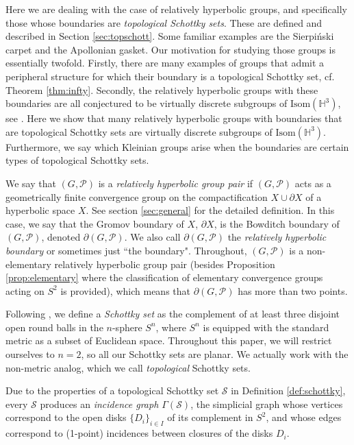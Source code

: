 \documentclass[11pt]{article}
\theoremstyle{definition}
\newcommand\Isom{\text{Isom}}
\begin{document}
Here we are dealing with the case of relatively hyperbolic groups, and specifically those whose boundaries are {\it topological Schottky sets}. These are defined and described in Section \ref{sec:topschott}. 
Some familiar examples are the Sierpi\'nski carpet and the Apollonian gasket. 
Our motivation for studying those groups is essentially twofold. Firstly, there are many examples of groups that admit a peripheral structure for which their boundary is a topological Schottky set, cf. Theorem \ref{thm:infty}.
Secondly, the relatively hyperbolic groups with these boundaries are all conjectured to be virtually discrete subgroups of $\Isom(\mathbb{H}^3)$, see \cite{hruska:walsh}. Here we show that many relatively hyperbolic groups with boundaries that are topological Schottky sets are virtually discrete subgroups of $\Isom(\mathbb{H}^3)$. Furthermore, we say which Kleinian groups arise when the boundaries are certain types of topological Schottky sets. 

We say that $(G,\mathcal{P})$ is a {\it relatively hyperbolic group pair} if $(G, \mathcal{P})$ acts as a geometrically finite convergence group on the compactification $X\cup \partial X$ of a hyperbolic space $X$. See section \ref{sec:general} for the detailed definition.  In this case, we say that the Gromov boundary of $X$, $\partial X$, is the Bowditch boundary of $(G, \mathcal{P})$, denoted $\partial(G, \mathcal{P}).$  We also call $\partial(G, \mathcal{P})$ the {\it relatively hyperbolic boundary} or sometimes just ``the boundary".  Throughout, $(G, \mathcal{P})$ is a non-elementary relatively hyperbolic group pair (besides Proposition \ref{prop:elementary} where the classification of elementary convergence groups acting on $S^2$ is provided), which means that $\partial(G, \mathcal{P})$ has more than two points.  

Following \cite{BKM}, we define a \emph{Schottky set} as the complement of at least three  
disjoint open round balls in the $n$-sphere $S^n$, where $S^n$ is equipped with the standard metric as a subset of Euclidean space.  Throughout this paper, we will restrict ourselves to $n=2$, so all our Schottky sets are planar. We actually work with the non-metric analog, which we call {\it topological} Schottky sets. 

Due to the properties of a topological Schottky set $\mathcal{S}$ in Definition \ref{def:schottky}, every $\mathcal{S}$ produces an {\it incidence graph $\Gamma(\mathcal{S})$}, the simplicial graph whose vertices correspond to the open disks $\{D_i\}_{i\in I}$ of its complement in $S^2$, and whose edges correspond to (1-point) incidences between closures of the disks $D_i$. 
\end{document}
